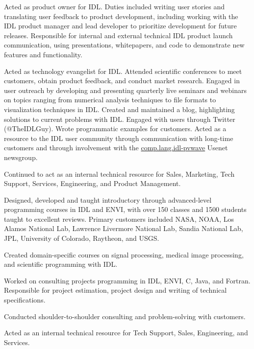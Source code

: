 \documentclass[letterpaper]{resume}
\begin{document}
\begin{compactitem}[\itembullet]
  \item Acted as product owner for IDL. Duties included writing user
    stories and translating user feedback to product development,
    including working with the IDL product manager and lead developer
    to prioritize development for future releases. Responsible for
    internal and external technical IDL product launch communication,
    using presentations, whitepapers, and code to demonstrate new
    features and functionality.
  \item Acted as technology evangelist for IDL. Attended scientific
    conferences to meet customers, obtain product feedback, and
    conduct market research. Engaged in user outreach by developing
    and presenting quarterly live seminars and webinars on topics
    ranging from numerical analysis techniques to file formats to
    visualization techniques in IDL. Created and maintained a blog,
    highlighting solutions to current problems with IDL. Engaged with
    users through Twitter (@TheIDLGuy). Wrote programmatic examples
    for customers. Acted as a resource to the IDL user community
    through communication with long-time customers and through
    involvement with the \url{comp.lang.idl-pvwave} Usenet newsgroup.
  \item Continued to act as an internal technical resource for Sales,
    Marketing, Tech Support, Services, Engineering, and Product
    Management.
\end{compactitem}

\begin{compactitem}[\itembullet]
  \item Designed, developed and taught introductory through
    advanced-level programming courses in IDL and ENVI, with over 150
    classes and 1500 students taught to excellent reviews. Primary
    customers included NASA, NOAA, Los Alamos National Lab, Lawrence
    Livermore National Lab, Sandia National Lab, JPL, University of
    Colorado, Raytheon, and USGS.
  \item Created domain-specific courses on signal processing, medical
    image processing, and scientific programming with IDL.
  \item Worked on consulting projects programming in IDL, ENVI, C,
    Java, and Fortran. Responsible for project estimation, project
    design and writing of technical specifications.
  \item Conducted shoulder-to-shoulder consulting and problem-solving
    with customers.
  \item Acted as an internal technical resource for Tech Support,
    Sales, Engineering, and Services.
\end{compactitem}
\end{document}
